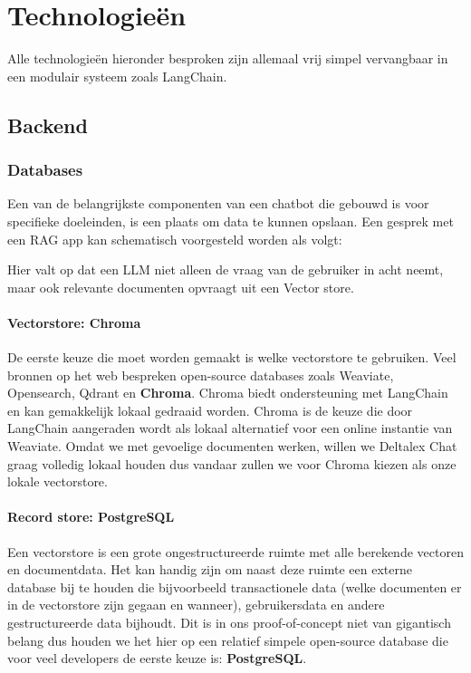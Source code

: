 \chapter{Technologieën}
\label{ch:technologies}
Alle technologieën hieronder besproken zijn allemaal vrij simpel vervangbaar in een modulair systeem zoals LangChain.

\section{Backend}
\subsection{Databases}
Een van de belangrijkste componenten van een chatbot die gebouwd is voor specifieke doeleinden, is een plaats om data te kunnen opslaan.
Een gesprek met een RAG app kan schematisch voorgesteld worden als volgt:

\begin{figure}[h]
\end{figure}

Hier valt op dat een LLM niet alleen de vraag van de gebruiker in acht neemt, maar ook relevante documenten opvraagt uit een Vector store. 

\subsubsection{Vectorstore: Chroma}
De eerste keuze die moet worden gemaakt is welke vectorstore te gebruiken. Veel bronnen op het web bespreken open-source databases zoals Weaviate, Opensearch, Qdrant en \textbf{Chroma}. 
Chroma biedt ondersteuning met LangChain en kan gemakkelijk lokaal gedraaid worden. 
Chroma is de keuze die door LangChain aangeraden wordt als lokaal alternatief voor een online instantie van Weaviate.  
Omdat we met gevoelige documenten werken, willen we Deltalex Chat graag volledig lokaal houden dus vandaar zullen we voor Chroma kiezen als onze lokale vectorstore. 

\subsubsection{Record store: PostgreSQL}
Een vectorstore is een grote ongestructureerde ruimte met alle berekende vectoren en documentdata. 
Het kan handig zijn om naast deze ruimte een externe database bij te houden die bijvoorbeeld transactionele data (welke documenten er in de vectorstore zijn gegaan en wanneer), 
gebruikersdata en andere gestructureerde data bijhoudt. Dit is in ons proof-of-concept niet van gigantisch belang dus houden we het hier op een relatief simpele open-source database  
die voor veel developers de eerste keuze is: \textbf{PostgreSQL}. 

